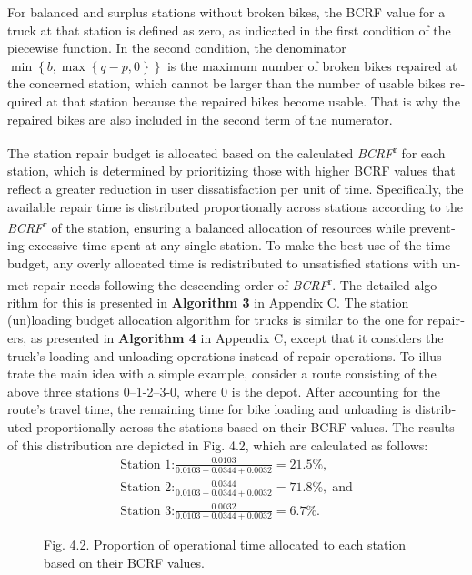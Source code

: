 \documentclass[
  english,
]{article}
\begin{document}
\begin{otherlanguage}{english}
\protect{}\label{p0505}
For balanced and surplus stations without broken bikes, the BCRF value for a truck at that station
is defined as zero, as indicated in the first condition of the piecewise function. In the second
condition, the denominator \(\min\left\{ {b,\max\left\{ {q - p,0} \right\}} \right\}\) is the
maximum number of broken bikes repaired at the concerned station, which cannot be larger than the
number of usable bikes required at that station because the repaired bikes become usable. That is
why the repaired bikes are also included in the second term of the numerator.

\protect{}\label{p0510}
The station repair budget is allocated based on the calculated \emph{BCRF}\textsuperscript{r} for
each station, which is determined by prioritizing those with higher BCRF values that reflect a
greater reduction in user dissatisfaction per unit of time. Specifically, the available repair time
is distributed proportionally across stations according to the \emph{BCRF}\textsuperscript{r} of the
station, ensuring a balanced allocation of resources while preventing excessive time spent at any
single station. To make the best use of the time budget, any overly allocated time is redistributed
to unsatisfied stations with unmet repair needs following the descending order of
\emph{BCRF}\textsuperscript{r}. The detailed algorithm for this is presented in \textbf{Algorithm 3}
in Appendix C. The station (un)loading budget allocation algorithm for trucks is similar to the one
for repairers, as presented in \textbf{Algorithm 4} in Appendix C, except that it considers the
truck's loading and unloading operations instead of repair operations. To illustrate the main idea
with a simple example, consider a route consisting of the above three stations 0--1-2--3-0, where 0
is the depot. After accounting for the route's travel time, the remaining time for bike loading and
unloading is distributed proportionally across the stations based on their BCRF values. The results
of this distribution are depicted in Fig. 4.2, which are calculated as follows:\[\begin{array}{l}
{\text{Station 1:}\frac{0.0103}{0.0103 + 0.0344 + 0.0032} = 21.5\%,} \\
{\text{Station 2:}\frac{0.0344}{0.0103 + 0.0344 + 0.0032} = 71.8\%,\;\text{and}} \\
{\text{Station 3:}\frac{0.0032}{0.0103 + 0.0344 + 0.0032} = 6.7\%.}
\end{array}\]

\begin{figure}
\centering
Fig. 4.2. Proportion of operational time allocated to each station based on their BCRF values.
\caption{}\label{f0025}
\end{figure}


\end{otherlanguage}
\end{document}
